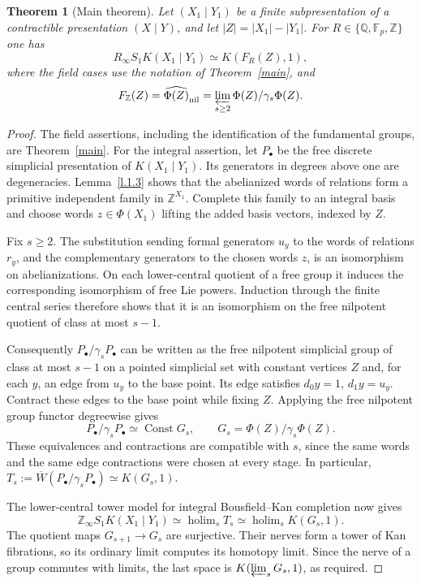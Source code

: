 \documentclass[11pt,a4paper]{article}
\newtheorem{theorem}{Theorem}[section] %
\begin{document}
\begin{theorem}[Main theorem]\label{c4}
Let $(X_1\mid Y_1)$ be a finite subpresentation of a contractible
presentation $(X\mid Y)$, and let $|Z|=|X_1|-|Y_1|$.  For
$R\in\{\mathbb Q,\mathbb F_p,\mathbb Z\}$ one has
\[
 R_\infty S_1K(X_1\mid Y_1)\simeq K(F_R(Z),1),
\]
where the field cases use the notation of Theorem~\ref{main}, and
\[
 F_{\mathbb Z}(Z)=\widehat{\Phi(Z)}_{\mathrm{nil}}
 =\varprojlim_{s\geq2}\Phi(Z)/\gamma_s\Phi(Z).
\]
\end{theorem}
\begin{proof}
The field assertions, including the identification of the fundamental
groups, are Theorem~\ref{main}.  For the integral assertion, let
$P_\bullet$ be the free discrete simplicial presentation of
$K(X_1\mid Y_1)$.  Its generators in degrees above one are degeneracies.
Lemma~\ref{l.1.3} shows that the abelianized words of relations form a
primitive independent family in $\mathbb Z^{X_1}$.  Complete this family
to an integral basis and choose words $z\in\Phi(X_1)$ lifting the added
basis vectors, indexed by $Z$.

Fix $s\geq2$.  The substitution sending formal generators $u_y$ to the
words of relations $r_y$, and the complementary generators to the
chosen words $z$, is an isomorphism on abelianizations.  On each
lower-central quotient of a free group it induces the corresponding
isomorphism of free Lie powers.  Induction through the finite central
series therefore shows that it is an isomorphism on the free nilpotent
quotient of class at most $s-1$.

Consequently $P_\bullet/\gamma_sP_\bullet$ can be written as the free
nilpotent simplicial group of class at most $s-1$ on a pointed simplicial
set with constant vertices $Z$ and, for each $y$, an edge from $u_y$ to
the base point.  Its edge satisfies $d_0y=1$, $d_1y=u_y$.
Contract these edges to the base point while fixing $Z$.  Applying the
free nilpotent group functor degreewise gives
\[
 P_\bullet/\gamma_sP_\bullet\simeq
 \operatorname{Const}G_s,\qquad G_s=\Phi(Z)/\gamma_s\Phi(Z).
\]
These equivalences and contractions are compatible with $s$, since the
same words and the same edge contractions were chosen at every stage.
In particular,
$T_s:=\overline W(P_\bullet/\gamma_sP_\bullet)\simeq K(G_s,1)$.

The lower-central tower model for integral Bousfield--Kan completion
\cite[Chapter~IV]{BK} now gives
\[
 \mathbb Z_\infty S_1K(X_1\mid Y_1)
 \simeq\operatorname{holim}_sT_s
 \simeq\operatorname{holim}_sK(G_s,1).
\]
The quotient maps $G_{s+1}\to G_s$ are surjective.  Their nerves form a
tower of Kan fibrations, so its ordinary limit computes its homotopy
limit.  Since the nerve of a group commutes with limits, the last space
is $K(\varprojlim_sG_s,1)$, as required.


\end{proof}
\end{document}
